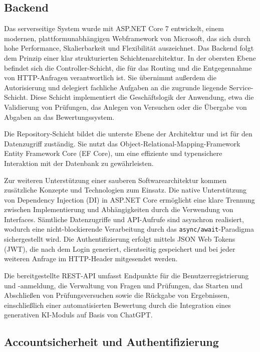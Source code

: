 \documentclass[a4paper,12pt]{article}
\begin{document}
\subsection{Backend}

Das serverseitige System wurde mit ASP.NET Core 7 entwickelt, einem modernen, plattformunabhängigen Webframework von Microsoft, das sich durch hohe Performance, Skalierbarkeit und Flexibilität auszeichnet. Das Backend folgt dem Prinzip einer klar strukturierten Schichtenarchitektur. In der obersten Ebene befindet sich die Controller-Schicht, die für das Routing und die Entgegennahme von HTTP-Anfragen verantwortlich ist. Sie übernimmt außerdem die Autorisierung und delegiert fachliche Aufgaben an die zugrunde liegende Service-Schicht. Diese Schicht implementiert die Geschäftslogik der Anwendung, etwa die Validierung von Prüfungen, das Anlegen von Versuchen oder die Übergabe von Abgaben an das Bewertungssystem.

Die Repository-Schicht bildet die unterste Ebene der Architektur und ist für den Datenzugriff zuständig. Sie nutzt das Object-Relational-Mapping-Framework Entity Framework Core (EF Core), um eine effiziente und typensichere Interaktion mit der Datenbank zu gewährleisten.

Zur weiteren Unterstützung einer sauberen Softwarearchitektur kommen zusätzliche Konzepte und Technologien zum Einsatz. Die native Unterstützung von Dependency Injection (DI) in ASP.NET Core ermöglicht eine klare Trennung zwischen Implementierung und Abhängigkeiten durch die Verwendung von Interfaces. Sämtliche Datenzugriffe und API-Aufrufe sind asynchron realisiert, wodurch eine nicht-blockierende Verarbeitung durch das \texttt{async/await}-Paradigma sichergestellt wird. Die Authentifizierung erfolgt mittels JSON Web Tokens (JWT), die nach dem Login generiert, clientseitig gespeichert und bei jeder weiteren Anfrage im HTTP-Header mitgesendet werden.

Die bereitgestellte REST-API umfasst Endpunkte für die Benutzerregistrierung und -anmeldung, die Verwaltung von Fragen und Prüfungen, das Starten und Abschließen von Prüfungsversuchen sowie die Rückgabe von Ergebnissen, einschließlich einer automatisierten Bewertung durch die Integration eines generativen KI-Moduls auf Basis von ChatGPT.


\subsection{Accountsicherheit und Authentifizierung}
\end{document}
